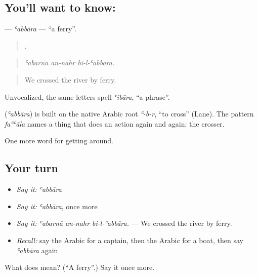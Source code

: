 \subsection*{You'll want to know: }
\textbf{} — \emph{ʿabbāra} — \textquotedblleft{}a ferry\textquotedblright{}.

\begin{quote}
  .
\end{quote}

\begin{quote}
\emph{ʿabarnā an-nahr bi-l-ʿabbāra.}
\end{quote}

\begin{quote}
We crossed the river by ferry.
\end{quote}

Unvocalized, the same letters spell \emph{ʿibāra}, \textquotedblleft{}a phrase\textquotedblright{}.

\begin{cousinweb}
\textbf{} (\emph{ʿabbāra}) is built on the native Arabic root \emph{ʿ-b-r}, \textquotedblleft{}to cross\textquotedblright{} (Lane). The pattern \emph{faʿʿāla} names a thing that does an action again and again: the crosser.
\end{cousinweb}

\begin{grammarlens}[title={What you've built}]
One more word for getting around.
\end{grammarlens}

\subsection*{Your turn}
\begin{itemize}
\raggedright
  \item \emph{Say it:} \emph{ʿabbāra}
  \item \emph{Say it:} \emph{ʿabbāra}, once more
  \item \emph{Say it:} \emph{ʿabarnā an-nahr bi-l-ʿabbāra.} — We crossed the river by ferry.
  \item \emph{Recall:} say the Arabic for a captain, then the Arabic for a boat, then say \emph{ʿabbāra} again
\end{itemize}

\begin{tcolorbox}[breakable,colback=teal!4,colframe=teal!35!black,title={Before you move on}]
What does  mean? (\textquotedblleft{}A ferry\textquotedblright{}.) Say it once more.
\end{tcolorbox}
